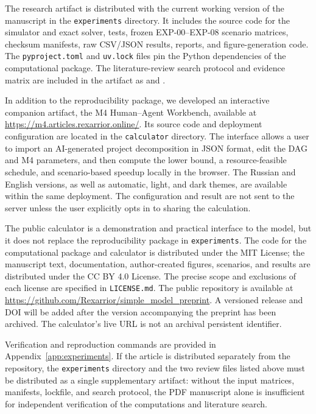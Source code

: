 The research artifact is distributed with the current working version of the
manuscript in the \texttt{experiments} directory. It includes the source code
for the simulator and exact solver, tests, frozen EXP-00--EXP-08 scenario
matrices, checksum manifests, raw CSV/JSON results, reports, and figure-generation
code. The \texttt{pyproject.toml} and \texttt{uv.lock} files pin the Python
dependencies of the computational package. The literature-review search
protocol and evidence matrix are included in the artifact as
 and
.

In addition to the reproducibility package, we developed an interactive
companion artifact, the M4 Human--Agent Workbench, available at
\url{https://m4.articles.rexarrior.online/}. Its source code and deployment
configuration are located in the \texttt{calculator} directory. The interface
allows a user to import an AI-generated project decomposition in JSON format,
edit the DAG and M4 parameters, and then compute the lower bound, a
resource-feasible schedule, and scenario-based speedup locally in the browser.
The Russian and English versions, as well as automatic, light, and dark themes,
are available within the same deployment. The configuration and result are not
sent to the server unless the user explicitly opts in to sharing the
calculation.

The public calculator is a demonstration and practical interface to the model,
but it does not replace the reproducibility package in \texttt{experiments}.
The code for the computational package and calculator is distributed under the
MIT License; the manuscript text, documentation, author-created figures,
scenarios, and results are distributed under the CC BY 4.0 License. The precise
scope and exclusions of each license are specified in \texttt{LICENSE.md}. The
public repository is available at
\url{https://github.com/Rexarrior/simple_model_preprint}. A versioned release
and DOI will be added after the version accompanying the preprint has been
archived. The calculator's live URL is not an archival persistent identifier.

Verification and reproduction commands are provided in
Appendix~\ref{app:experiments}. If the article is distributed separately from
the repository, the \texttt{experiments} directory and the two review files
listed above must be distributed as a single supplementary artifact: without
the input matrices, manifests, lockfile, and search protocol, the PDF manuscript
alone is insufficient for independent verification of the computations and
literature search.


